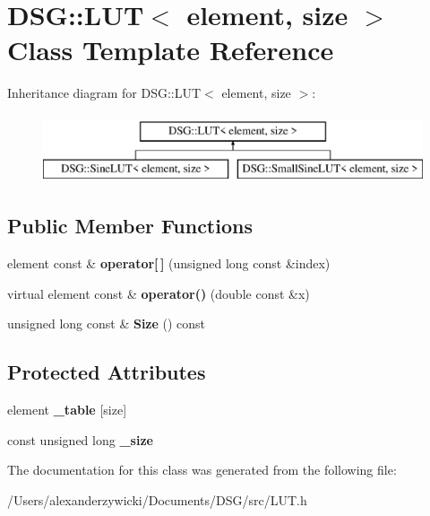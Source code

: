 \hypertarget{class_d_s_g_1_1_l_u_t}{\section{D\+S\+G\+:\+:L\+U\+T$<$ element, size $>$ Class Template Reference}
\label{class_d_s_g_1_1_l_u_t}
}
Inheritance diagram for D\+S\+G\+:\+:L\+U\+T$<$ element, size $>$\+:\begin{figure}[H]
\begin{center}
\leavevmode
\includegraphics[height=2.000000cm]{class_d_s_g_1_1_l_u_t}
\end{center}
\end{figure}
\subsection*{Public Member Functions}
\begin{DoxyCompactItemize}
\item 
\hypertarget{class_d_s_g_1_1_l_u_t_a5f3bc252bd650fae13046e7959b94f81}{element const \& {\bfseries operator\mbox{[}$\,$\mbox{]}} (unsigned long const \&index)}\label{class_d_s_g_1_1_l_u_t_a5f3bc252bd650fae13046e7959b94f81}

\item 
\hypertarget{class_d_s_g_1_1_l_u_t_a131c3cf974754270699fdcda74f2e694}{virtual element const \& {\bfseries operator()} (double const \&x)}\label{class_d_s_g_1_1_l_u_t_a131c3cf974754270699fdcda74f2e694}

\item 
\hypertarget{class_d_s_g_1_1_l_u_t_a2d1a2112f9e960c7b70882a19d670ff9}{unsigned long const \& {\bfseries Size} () const }\label{class_d_s_g_1_1_l_u_t_a2d1a2112f9e960c7b70882a19d670ff9}

\end{DoxyCompactItemize}
\subsection*{Protected Attributes}
\begin{DoxyCompactItemize}
\item 
\hypertarget{class_d_s_g_1_1_l_u_t_ac8b23bbb7ce259d4ceb1c6fa93a7f29f}{element {\bfseries \+\_\+table} \mbox{[}size\mbox{]}}\label{class_d_s_g_1_1_l_u_t_ac8b23bbb7ce259d4ceb1c6fa93a7f29f}

\item 
\hypertarget{class_d_s_g_1_1_l_u_t_a87c352b5eaea2188955213c0f4ae9799}{const unsigned long {\bfseries \+\_\+size}}\label{class_d_s_g_1_1_l_u_t_a87c352b5eaea2188955213c0f4ae9799}

\end{DoxyCompactItemize}


The documentation for this class was generated from the following file\+:\begin{DoxyCompactItemize}
\item 
/\+Users/alexanderzywicki/\+Documents/\+D\+S\+G/src/L\+U\+T.\+h\end{DoxyCompactItemize}
